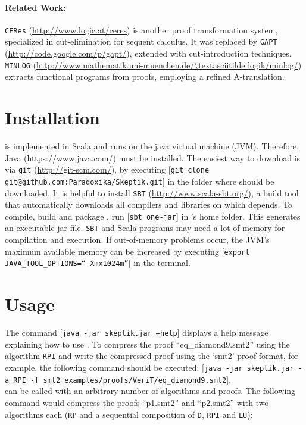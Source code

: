 \documentclass{llncs}
\begin{document}
\paragraph{Related Work:} \texttt{CERes} (\url{http://www.logic.at/ceres})
is another proof transformation system, specialized in cut-elimination for sequent calculus. It was replaced by \texttt{GAPT} (\url{http://code.google.com/p/gapt/}), 
extended with cut-introduction techniques.
\texttt{MINLOG} (\url{http://www.mathematik.uni-muenchen.de/\textasciitilde logik/minlog/}) 
extracts functional programs from proofs, employing a refined A-translation.


\newcommand{\com}[1]{[\texttt{#1}]}

\section{Installation}

{\skeptik} is implemented in Scala and runs on the java virtual machine (JVM). Therefore, Java (\url{https://www.java.com/}) must be installed. The easiest way to download {\skeptik} is via \texttt{git} (\url{http://git-scm.com/}), by executing \com{git clone git@github.com:Paradoxika/Skeptik.git} in the folder where {\skeptik} should be downloaded. It is helpful to install \texttt{SBT} (\url{http://www.scala-sbt.org/}), a build tool that automatically downloads all compilers and libraries on which {\skeptik} depends. To compile, build and package {\skeptik}, run \com{sbt one-jar} in {\skeptik}'s home folder. This generates an executable jar file.
%
\texttt{SBT} and Scala programs may need a lot of memory for compilation and execution. If out-of-memory problems occur, the JVM's maximum available memory can be increased by executing \com{export JAVA\_TOOL\_OPTIONS=``-Xmx1024m''} in the terminal.


\section{Usage}

The command \com{java -jar skeptik.jar --help} displays a help message explaining how to use {\skeptik}. To compress the proof ``eq\_diamond9.smt2'' using the algorithm \texttt{RPI} and write the compressed proof using the `smt2' proof format, for example, the following command should be executed: \com{java -jar skeptik.jar -a RPI -f smt2 examples/proofs/VeriT/eq\_diamond9.smt2}. \\
{\skeptik} can be called with an arbitrary number of algorithms and proofs. The following command would compress the proofs ``p1.smt2'' and ``p2.smt2'' with two algorithms each (\texttt{RP} and a sequential composition of \texttt{D}, \texttt{RPI} and \texttt{LU}): \\
\com{java -jar skeptik.jar -a RP -a (D*RPI*LU) p1.smt2 p2.smt2} 
\end{document}
